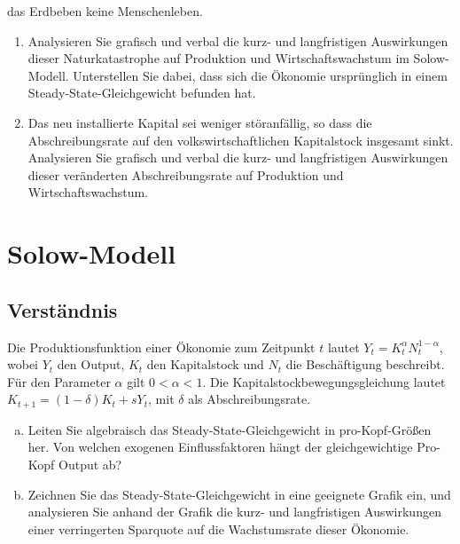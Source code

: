 \documentclass{scrartcl}
\begin{document}
\begin{enumerate}
das Erdbeben keine Menschenleben.
\begin{enumerate}
\item Analysieren Sie grafisch und verbal die kurz- und langfristigen Auswirkungen dieser Naturkatastrophe auf Produktion und Wirtschaftswachstum im Solow-Modell. Unterstellen Sie dabei, dass sich die Ökonomie ursprünglich in einem Steady-State-Gleichgewicht befunden hat.
\item Das neu installierte Kapital sei weniger störanfällig, so dass die Abschreibungsrate auf den volkswirtschaftlichen Kapitalstock insgesamt sinkt. Analysieren Sie grafisch und verbal die kurz- und langfristigen Auswirkungen dieser veränderten Abschreibungsrate auf Produktion und Wirtschaftswachstum.
\end{enumerate}
\end{enumerate}

\section{Solow-Modell}

\subsection{Verständnis}
Die Produktionsfunktion einer Ökonomie zum Zeitpunkt $t$ lautet $Y_t=K_t^\alpha N_t^{1-\alpha}$, wobei $Y_t$ den Output, $K_t$ den Kapitalstock und $N_t$ die Beschäftigung beschreibt. Für den Parameter $\alpha$ gilt $0<\alpha<1$. Die Kapitalstockbewegungsgleichung lautet $K_{t+1}=(1-\delta)K_t + s Y_t$, mit $\delta$ als Abschreibungsrate.
\begin{enumerate}[(a)]
\item Leiten Sie algebraisch das Steady-State-Gleichgewicht in pro-Kopf-Größen her. Von welchen exogenen Einflussfaktoren hängt der gleichgewichtige Pro-Kopf Output ab?
\item Zeichnen Sie das Steady-State-Gleichgewicht in eine geeignete Grafik ein, und analysieren Sie anhand der Grafik die kurz- und langfristigen Auswirkungen einer verringerten Sparquote auf die Wachstumsrate dieser Ökonomie.
\end{enumerate}
\end{document}
